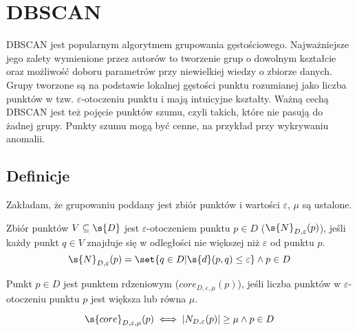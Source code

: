 \section{DBSCAN}
DBSCAN \cite{dbscan} jest popularnym algorytmem grupowania gęstościowego. Najważniejsze jego zalety wymienione przez autorów to tworzenie grup o dowolnym kształcie oraz możliwość doboru parametrów przy niewielkiej wiedzy o zbiorze danych. Grupy tworzone są na podstawie lokalnej gęstości punktu rozumianej jako liczba punktów w tzw. $ \varepsilon $-otoczeniu punktu i mają intuicyjne kształty. Ważną cechą DBSCAN jest też pojęcie punktów szumu, czyli takich, które nie pasują do żadnej grupy. Punkty szumu mogą być cenne, na przykład przy wykrywaniu anomalii.

\subsection{Definicje}
Zakładam, że grupowaniu poddany jest zbiór punktów  i wartości $ \varepsilon $, $ \mu $ są ustalone.
\smallskip

\newline
 Zbiór punktów $ V \subseteq \s{D} $ jest $ \varepsilon $-otoczeniem punktu $ p\in D $ ($ \s{N}_{D,\varepsilon}(p) $), jeśli każdy punkt $ q \in V $ znajduje się w odległości nie większej niż $ \varepsilon $ od punktu $ p $.
\begin{equation}\label{eq:eps-neighbourhood}
	\s{N}_{D,\varepsilon}(p) = \set{q \in D | \s{d}(p, q) \le \varepsilon} \land p \in D
\end{equation}

\newline
Punkt $ p \in D $ jest punktem rdzeniowym ($ core_{D,\varepsilon,\mu}(p) $), jeśli liczba punktów w $ \varepsilon $-otoczeniu punktu $ p $ jest większa lub równa $ \mu $.

\begin{equation}\label{core-point}
	\s{core}_{D,\varepsilon,\mu}(p) \iff |N_{D,\varepsilon}(p)| \ge \mu \land p \in D
\end{equation}



